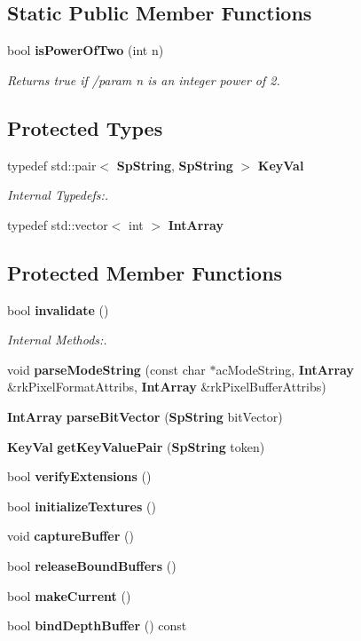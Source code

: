 \subsection*{Static Public Member Functions}
\begin{CompactItemize}
\item 
bool {\bf is\-Power\-Of\-Two} (int n)
\begin{CompactList}\small\item\em Returns true if /param n is an integer power of 2. \item\end{CompactList}\end{CompactItemize}
\subsection*{Protected Types}
\begin{CompactItemize}
\item 
typedef std::pair$<$ {\bf Sp\-String}, {\bf Sp\-String} $>$ {\bf Key\-Val}
\begin{CompactList}\small\item\em Internal Typedefs:. \item\end{CompactList}\item 
typedef std::vector$<$ int $>$ {\bf Int\-Array}
\end{CompactItemize}
\subsection*{Protected Member Functions}
\begin{CompactItemize}
\item 
bool {\bf invalidate} ()
\begin{CompactList}\small\item\em Internal Methods:. \item\end{CompactList}\item 
void {\bf parse\-Mode\-String} (const char $\ast$ac\-Mode\-String, {\bf Int\-Array} \&rk\-Pixel\-Format\-Attribs, {\bf Int\-Array} \&rk\-Pixel\-Buffer\-Attribs)
\item 
{\bf Int\-Array} {\bf parse\-Bit\-Vector} ({\bf Sp\-String} bit\-Vector)
\item 
{\bf Key\-Val} {\bf get\-Key\-Value\-Pair} ({\bf Sp\-String} token)
\item 
bool {\bf verify\-Extensions} ()
\item 
bool {\bf initialize\-Textures} ()
\item 
void {\bf capture\-Buffer} ()
\item 
bool {\bf release\-Bound\-Buffers} ()
\item 
bool {\bf make\-Current} ()
\item 
bool {\bf bind\-Depth\-Buffer} () const
\end{CompactItemize}
